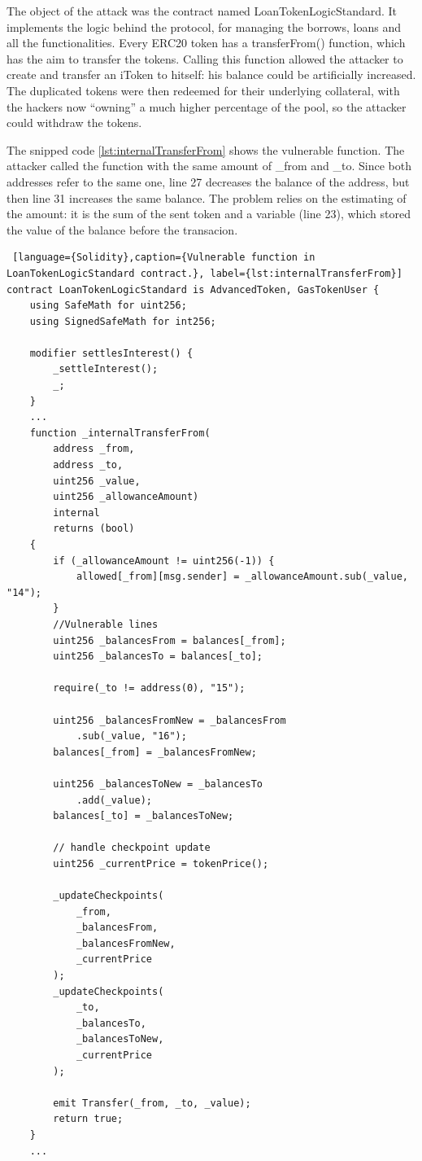 The object of the attack was the contract named LoanTokenLogicStandard.
It implements the logic behind the protocol, for managing the borrows, loans and all the functionalities.
Every ERC20 token has a transferFrom() function, which has the aim to transfer the tokens.
Calling this function allowed the attacker to create and transfer an iToken to hitself: his balance could be artificially increased.
The duplicated tokens were then redeemed for their underlying collateral, 
with the hackers now “owning” a much higher percentage of the pool, so the attacker could withdraw the tokens.

The snipped code \autoref{lst:internalTransferFrom} shows the vulnerable function. 
The attacker called the function with the same amount of \_from and \_to. 
Since both addresses refer to the same one, line 27 decreases the balance of the address, but then line 31 increases the same balance. 
The problem relies on the estimating of the amount: it is the sum of the sent token and 
a variable (line 23), which stored the value of the balance before the transacion.

\begin{lstlisting} [language={Solidity},caption={Vulnerable function in LoanTokenLogicStandard contract.}, label={lst:internalTransferFrom}]
contract LoanTokenLogicStandard is AdvancedToken, GasTokenUser {
    using SafeMath for uint256;
    using SignedSafeMath for int256;

    modifier settlesInterest() {
        _settleInterest();
        _;
    }
    ... 
    function _internalTransferFrom(
        address _from,
        address _to,
        uint256 _value,
        uint256 _allowanceAmount)
        internal
        returns (bool)
    {
        if (_allowanceAmount != uint256(-1)) {
            allowed[_from][msg.sender] = _allowanceAmount.sub(_value, "14");
        }
        //Vulnerable lines 
        uint256 _balancesFrom = balances[_from];
        uint256 _balancesTo = balances[_to];

        require(_to != address(0), "15");

        uint256 _balancesFromNew = _balancesFrom
            .sub(_value, "16");
        balances[_from] = _balancesFromNew;

        uint256 _balancesToNew = _balancesTo
            .add(_value);
        balances[_to] = _balancesToNew;

        // handle checkpoint update
        uint256 _currentPrice = tokenPrice();

        _updateCheckpoints(
            _from,
            _balancesFrom,
            _balancesFromNew,
            _currentPrice
        );
        _updateCheckpoints(
            _to,
            _balancesTo,
            _balancesToNew,
            _currentPrice
        );

        emit Transfer(_from, _to, _value);
        return true;
    }
    ... 
\end{lstlisting}

